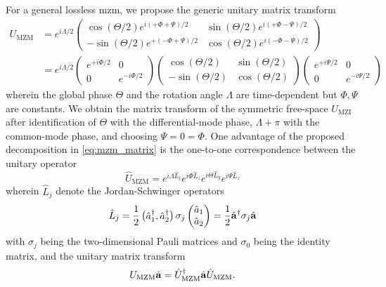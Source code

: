For a general lossless \gls{mzm}, we propose the generic unitary matrix transform~\cite[p.~95]{Leonhardt2010}
\begin{equation}
	\begin{split}
		U_\text{MZM}
		&=
		e^{i\Lambda/2}
		\begin{pmatrix}
			\cos(\Theta/2)e^{i(+\Phi+\Psi)/2} & \sin(\Theta/2)e^{i(+\Phi-\Psi)/2} \\
			-\sin(\Theta/2)e^{+(-\Phi+\Psi)/2} & \cos(\Theta/2)e^{i(-\Phi-\Psi)/2}
		\end{pmatrix}
		\\
		&=
		e^{i\Lambda/2}
		\begin{pmatrix}
			e^{+i\Phi/2} & 0 \\
			0 & e^{-i\Phi/2}
		\end{pmatrix}
		\begin{pmatrix}
			\cos(\Theta/2) & \sin(\Theta/2) \\
			-\sin(\Theta/2) & \cos(\Theta/2)
		\end{pmatrix}
		\begin{pmatrix}
			e^{+i\Psi/2} & 0 \\
			0 & e^{-i\Psi/2}
		\end{pmatrix}
	\end{split}
	\label{eq:mzm_matrix}
\end{equation}
wherein the global phase $\Theta$ and the rotation angle $\Lambda$ are time-dependent but $\Phi,\Psi$ are constants.
We obtain the matrix transform of the symmetric free-space $U_\text{MZI}$ after identification of $\Theta$ with the differential-mode phase, $\Lambda+\pi$ with the common-mode phase, and choosing $\Psi=0=\Phi$.
One advantage of the proposed decomposition in \cref{eq:mzm_matrix} is the one-to-one correspondence between the unitary operator~\cite[p.~99]{Leonhardt2010}
\begin{equation}
	\hat{U}_\text{MZM}
	=
	e^{i\Lambda\hat{L}_t}
	e^{i\Phi\hat{L}_z}
	e^{i\Theta\hat{L}_y}
	e^{i\Psi\hat{L}_z}
	\label{eq:mzm_operator}
\end{equation}
wherein $\hat{L}_j$ denote the Jordan-Schwinger operators~\cite[p.~97]{Leonhardt2010}
\begin{equation}
	\hat{L}_j
	=
	\frac{1}{2}
	\begin{pmatrix}
		\hat{a}_1^\dagger, \hat{a}_2^\dagger
	\end{pmatrix}
	\sigma_j
	\begin{pmatrix}
		\hat{a}_1 \\
		\hat{a}_2
	\end{pmatrix}
	=
	\frac{1}{2}
	\hat{\vb{a}}^\dagger
	\sigma_j
	\hat{\vb{a}}
\end{equation}
with $\sigma_j$ being the two-dimensional Pauli matrices and $\sigma_0$ being the identity matrix, and the unitary matrix transform
\begin{equation}
	U_\text{MZM}
	\hat{\vb{a}}
	=
	\hat{U}_\text{MZM}^\dagger
	\hat{\vb{a}}
	\hat{U}_\text{MZM}
	.
\end{equation}

